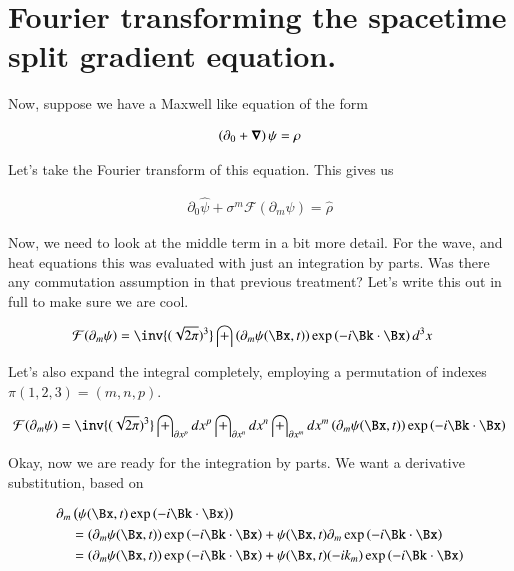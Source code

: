\documentclass{article}
\newcommand{\FF}[0]{\mathcal{F}}
\begin{document}
\section{ Fourier transforming the spacetime split gradient equation. }

Now, suppose we have a Maxwell like equation of the form

\begin{align}\label{eqn:spacetimeGradientEquation}
\left(\partial_0 + \boldsymbol{\nabla} \right) \psi = \rho
\end{align}

Let's take the Fourier transform of this equation.  This gives us

\begin{align*}
\partial_0 \hat{\psi} + \sigma^m \FF(\partial_m \psi) = \hat{\rho}
\end{align*}

Now, we need to look at the middle term in a bit more detail.  For the wave, and heat equations this was evaluated with just an integration
by parts.  Was there any commutation assumption in that previous treatment?  Let's write this out in full to make sure we are cool.

\begin{align*}
\FF(\partial_m \psi) 
&= \inv{(\sqrt{2\pi})^3} \int \left(\partial_m \psi(\Bx, t)\right) \exp\left( -i \Bk \cdot \Bx \right) d^3 x 
\end{align*}

Let's also expand the integral completely, employing a permutation of indexes $\pi(1,2,3) = (m,n,p)$.

\begin{align*}
\FF(\partial_m \psi) 
&= 
\inv{(\sqrt{2\pi})^3} 
\int_{\partial x^p} dx^p
\int_{\partial x^n} dx^n
\int_{\partial x^m} dx^m
\left(\partial_m \psi(\Bx, t)\right) \exp\left( -i \Bk \cdot \Bx \right) \\
\end{align*}

Okay, now we are ready for the integration by parts.  We want a derivative substitution, based on

\begin{align*}
\partial_m &\left( \psi(\Bx, t) \exp\left( -i \Bk \cdot \Bx \right) \right) \\
&= (\partial_m \psi(\Bx, t)) \exp\left( -i \Bk \cdot \Bx \right) + \psi(\Bx, t) \partial_m \exp\left( -i \Bk \cdot \Bx \right) \\
&= (\partial_m \psi(\Bx, t)) \exp\left( -i \Bk \cdot \Bx \right) + \psi(\Bx, t) ( -i k_m ) \exp\left( -i \Bk \cdot \Bx \right) \\
\end{align*}
\end{document}
